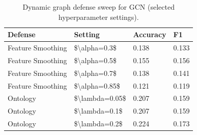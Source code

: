 \begin{table}[t]
\centering
\small
\begin{tabular}{llll}
\toprule
Defense & Setting & Accuracy & F1 \\
\midrule
Feature Smoothing & \$\textbackslash alpha=0.3\$ & 0.138 & 0.133 \\
Feature Smoothing & \$\textbackslash alpha=0.5\$ & 0.155 & 0.156 \\
Feature Smoothing & \$\textbackslash alpha=0.7\$ & 0.138 & 0.141 \\
Feature Smoothing & \$\textbackslash alpha=0.85\$ & 0.121 & 0.119 \\
Ontology & \$\textbackslash lambda=0.05\$ & 0.207 & 0.159 \\
Ontology & \$\textbackslash lambda=0.1\$ & 0.207 & 0.159 \\
Ontology & \$\textbackslash lambda=0.2\$ & 0.224 & 0.173 \\
\bottomrule
\end{tabular}

\caption{Dynamic graph defense sweep for GCN (selected hyperparameter settings).}
\label{tab:dynamic_defense_sweep}
\end{table}
